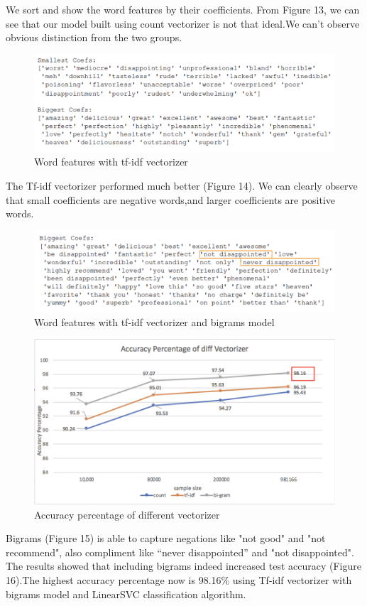 \documentclass{article}
\begin{document}
We sort and show the word features by their coefficients. From Figure 13, we can see that our model built using count vectorizer is not that ideal.We can't observe obvious distinction from the two groups.

\begin{figure}[!h]
\centering
\includegraphics[width=\textwidth]{countwords.png}
\caption{Word features with tf-idf vectorizer}
\end{figure}
The Tf-idf vectorizer performed much better (Figure 14). We can clearly observe that small coefficients are negative words,and larger coefficients are positive words. 

\begin{figure}[!h]
\centering
\includegraphics[width=\textwidth]{bigramwords.png}
\caption{Word features with tf-idf vectorizer and bigrams model}
\end{figure}
\begin{figure}[!ht]
\centering
\includegraphics[width=\textwidth]{bigram.png}
\caption{Accuracy percentage of different vectorizer}
\end{figure}
Bigrams (Figure 15) is able to capture negations like "not good" and "not recommend", also compliment like “never disappointed” and "not disappointed". The results showed that including bigrams indeed increased test accuracy (Figure 16).The highest accuracy percentage now is 98.16\% using Tf-idf vectorizer with bigrams model and LinearSVC classification algorithm. 
\end{document}
